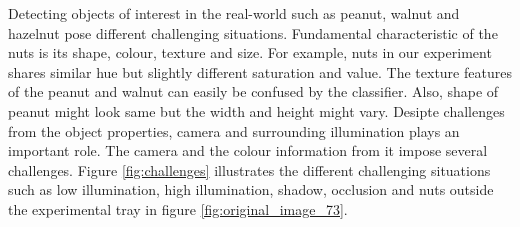 \documentclass[journal,onecolumn,12pt]{IEEEtran}
\begin{document}



Detecting objects of interest in the real-world such as peanut, walnut and hazelnut pose different challenging situations. Fundamental characteristic of the nuts is its shape, colour, texture and size. For example, nuts in our experiment shares similar hue but slightly different saturation and value. The texture features of the peanut and walnut can easily be confused by the classifier. Also, shape of peanut might look same but the width and height might vary. Desipte challenges from the object properties, camera and surrounding illumination plays an important role. The camera and the colour information from it impose several challenges. Figure \ref{fig:challenges} illustrates the different challenging situations such as low illumination, high illumination, shadow, occlusion and nuts outside the experimental tray in figure \ref{fig:original_image_73}.
\end{document}
